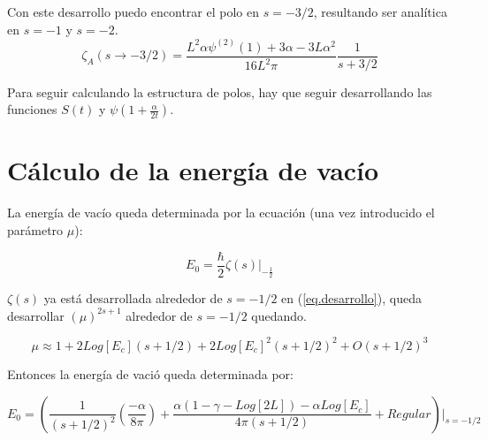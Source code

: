 Con este desarrollo puedo encontrar el polo en $s=-3/2$, resultando ser analítica en $s=-1$ y $s=-2$.
\begin{equation}
\zeta _A (s \rightarrow -3/2) = 
\frac{L ^2 \alpha \psi ^{(2)} (1) + 3 \alpha - 3 L \alpha ^2}{16 L^2 \pi}
\frac{1}{s+3/2}
\end{equation}

Para seguir calculando la estructura de polos, hay que seguir desarrollando las funciones $S(t)$ y $\psi (1 + \frac{\alpha}{2 t})$.

\section{Cálculo de la energía de vacío}

La energía de vacío queda determinada por la ecuación (una vez introducido el parámetro $\mu$): 

\begin{equation}
    E _0 = \frac{\hbar}{2}  
    \zeta (s)  |  _{- \frac{1}{2}}
\end{equation}

$\zeta (s)$ ya está desarrollada alrededor de $s=-1/2$ en (\ref{eq.desarrollo}), queda desarrollar $(\mu) ^{2s+1} $ alrededor de $s=-1/2$ quedando.

\begin{equation}
    \mu \approx 
    1 + 2 Log[E_c] (s + 1/2) +
    2 Log[E_c] ^2 (s+1/2) ^2 + 
    O (s+1/2)^3
\end{equation}

Entonces la energía de vació queda determinada por:

\begin{equation}
    E _0 =
    \left(
    \frac{1}{(s+1/2)^2} 
    \left(
    \frac{- \alpha}{8 \pi}
    \right)+
    \frac{
    \alpha(1 -\gamma-Log[2L]) - 
    \alpha Log[E_c] 
    }{4 \pi (s+1/2)} 
     + Regular
    \right) | _{s=-1/2}
\end{equation}\\



 
